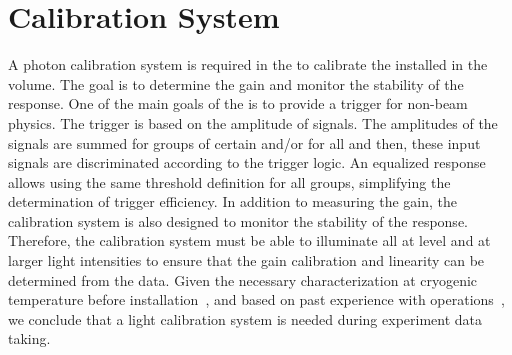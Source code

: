 \section{Calibration System}
\label{sec:dp-pds-calibration}

A photon calibration system is required in the  to calibrate the  installed in the  volume. The goal is to determine the  gain and monitor the stability of the  response. One of the main goals of the  is to provide a trigger for non-beam physics. The trigger is based on the amplitude of  signals. The amplitudes of the  signals are summed for groups of certain  and/or for all  and then, these input signals are discriminated according to the trigger logic. An equalized  response allows using the same threshold definition for all  groups, simplifying the determination of trigger efficiency. In addition to measuring the  gain, the calibration system is also designed to monitor the stability of the  response. %
Therefore, the calibration system must be able to illuminate all  at  level and at larger light intensities to ensure that the gain calibration and linearity can be determined from the data. Given the necessary  characterization at cryogenic temperature before installation~\cite{Belver:2018erf}, and based on past experience with  %
operations~\cite{Aimard:2018yxp}, we conclude that a light calibration system is needed during experiment data taking.




